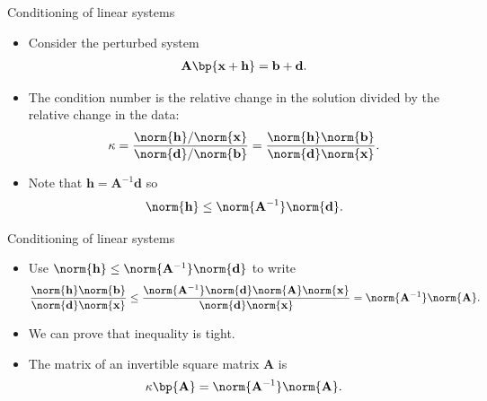 \documentclass[11pt,xcolor={dvipsnames},aspectratio=159,hyperref={pdftex,pdfpagemode=UseNone,hidelinks,pdfdisplaydoctitle=true},usepdftitle=false]{beamer}
\begin{document}
\begin{frame}{Conditioning of linear systems}
    \begin{itemize} 
        \item Consider the perturbed system \begin{align*}
            \mathbf{A}\bp{ \mathbf{x}+ \mathbf{h}}  = \mathbf{b} + \mathbf{d}. \end{align*}
            \item The condition number is the relative change in the solution divided by the relative change in the data: \begin{align*}
                \kappa = \frac{\norm{\mathbf{h}}/\norm{\mathbf{x}}}{\norm{\mathbf{d}}/\norm{\mathbf{b}}} = \frac{\norm{\mathbf{h}}\norm{\mathbf{b}}}{\norm{\mathbf{d}}\norm{\mathbf{x}}}.
            \end{align*}
            \item Note that $\mathbf{h} = \mathbf{A}^{-1} \mathbf{d}$ so \begin{align*}
                \norm{\mathbf{h}} \leq \norm{\mathbf{A}^{-1}} \norm{\mathbf{d}}.
            \end{align*}
            \end{itemize}
\end{frame}


\begin{frame}{Conditioning of linear systems}
    \begin{itemize} 
        \item Use $\norm{\mathbf{h}} \leq \norm{\mathbf{A}^{-1}} \norm{\mathbf{d}}$ to write   \begin{align*}
            \frac{\norm{\mathbf{h}}\norm{\mathbf{b}}}{\norm{\mathbf{d}}\norm{\mathbf{x}}} \leq \frac{\norm{\mathbf{A}^{-1}}\norm{\mathbf{d}}\norm{\mathbf{A}}\norm{\mathbf{x}}}{\norm{\mathbf{d}}\norm{\mathbf{x}}} = \norm{\mathbf{A}^{-1}}\norm{\mathbf{A}}.
            \end{align*}
        \item We can prove that inequality is tight.
        \item The matrix  of an invertible square matrix $\mathbf{A}$ is $$\kappa\bp{\mathbf{A}} = \norm{\mathbf{A}^{-1}}\norm{\mathbf{A}}.$$
            \end{itemize}
\end{frame}
\end{document}
